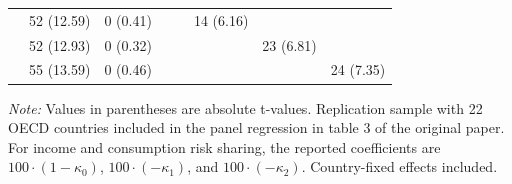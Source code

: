 \begin{table}[!htbp]
{\begin{tabular}{lccccccc}
& 52 (12.59) 
& 0 (0.41) 
& 
& 
& 14 (6.16) 
& 
& \\

& 52 (12.93) 
& 0 (0.32) 
& 
& 
& 
& 23 (6.81) 
& \\

& 55 (13.59) 
& 0 (0.46) 
& 
& 
& 
& 
& 24 (7.35) \\

\hline 
\hline
\end{tabular}%
}

\vspace{0.15cm}

\begin{minipage}{\linewidth}
\footnotesize
\textit{Note:} Values in parentheses are absolute t-values. Replication sample with 22 OECD countries included in the panel regression in table 3 of the original paper. For income and consumption risk sharing, the reported coefficients are \(100 \cdot (1-\kappa_0)\), \(100 \cdot (-\kappa_1)\), and \(100 \cdot (-\kappa_2)\). Country-fixed effects included.
\end{minipage}

\end{table}
